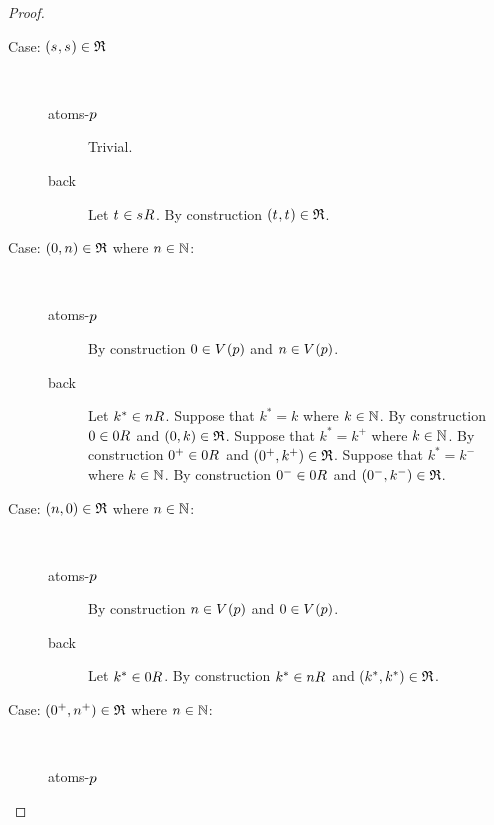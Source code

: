 \begin{proof}
\begin{description}
    \item[Case: $(\kStateS, \kStateS) \in \refinement$]\hfill\\
        \begin{description}
            \item[atoms-$p$]
                Trivial.
            \item[back]
                Let $\kStateT \in \kSuccessors{}{\kStateS}$. 
                By construction $(\kStateT, \kStateT) \in \refinement$.
        \end{description}
    \item[Case: $(0, n) \in \mathfrak{R}$ where $n \in \mathbb{N}$:]\hfill\\
        \begin{description}
            \item[atoms-$p$]
                By construction $0 \in \kValuation(\atomP)$ and $n \in \kValuation(\atomP)$.
            \item[back]
                Let $k^* \in \kSuccessors{}{n}$.
                Suppose that $k^* = k$ where $k \in \mathbb{N}$.
                By construction $0 \in \kSuccessors{}{0}$ and $(0, k) \in \mathfrak{R}$.
                Suppose that $k^* = k^+$ where $k \in \mathbb{N}$.
                By construction $0^+ \in \kSuccessors{}{0}$ and $(0^+, k^+) \in \mathfrak{R}$.
                Suppose that $k^* = k^-$ where $k \in \mathbb{N}$.
                By construction $0^- \in \kSuccessors{}{0}$ and $(0^-, k^-) \in \mathfrak{R}$.
        \end{description}
    \item[Case: $(n, 0) \in \mathfrak{R}$ where $n \in \mathbb{N}$:]\hfill\\
        \begin{description}
            \item[atoms-$p$]
                By construction $n \in \kValuation(\atomP)$ and $0 \in \kValuation(\atomP)$.
            \item[back]
                Let $k^* \in \kSuccessors{}{0}$.
                By construction $k^* \in \kSuccessors{}{n}$ and $(k^*, k^*) \in \mathfrak{R}$.
        \end{description}
    \item[Case: $(0^+, n^+) \in \mathfrak{R}$ where $n \in \mathbb{N}$:]\hfill\\
        \begin{description}
            \item[atoms-$p$]

\end{description}
\end{description}
\end{proof}
